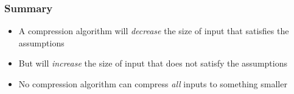 \begin{frame}
  \frametitle{Summary}
  \begin{itemize}
    \item A compression algorithm will \emph{decrease}
          the size of input that satisfies the assumptions
    \item But will \emph{increase} the size of input
          that does not satisfy the assumptions
    \item No compression algorithm can compress \emph{all} inputs to something smaller
  \end{itemize}
\end{frame}




